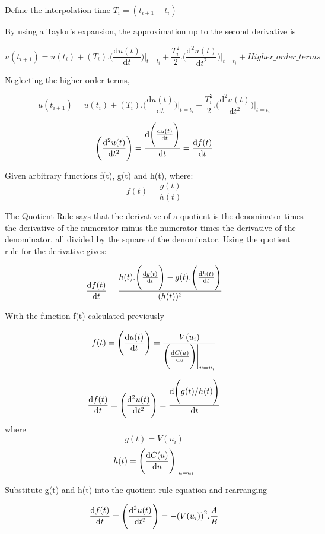 \noindent Define the interpolation time $T_{i} = (t_{i+1} - t_{i})$    
\vspace{0.5cm}   



By using a Taylor's expansion, the approximation up to the second derivative is

\[ u(t_{i+1}) = u(t_{i}) + (T_{i}).{\Bigg ( \frac{\mathrm{d}u(t)}{\mathrm{d}t}  \Bigg ) \Bigg |_{t=t_{i}}} + \frac{T_{i}^{2}}{2}.{\Bigg ( \frac{\mathrm{d^2}u(t)}{\mathrm{d}t^2} \Bigg ) \Bigg |_{t=t_{i}}} + Higher\_order\_terms \]

Neglecting the higher order terms,

\[ u(t_{i+1}) = u(t_{i}) + (T_{i}).{\Bigg ( \frac{\mathrm{d}u(t)}{\mathrm{d}t} \Bigg ) \Bigg |_{t=t_{i}}} + \frac{T_{i}^{2}}{2}.{\Bigg ( \frac{\mathrm{d^2}u(t)}{\mathrm{d}t^2}  \Bigg ) \Bigg |_{t=t_{i}}} \]

\[\Bigg (  \frac{\mathrm{d^2}u(t)}{\mathrm{d}t^2} \Bigg ) =  \odv{\Bigg (\frac{\mathrm{d}u(t)}{\mathrm{d}t}   \Bigg)}{t} = \odv{f(t)}{t}  \]

\vspace{0.5cm}  

Given arbitrary functions f(t), g(t) and h(t), where: 
\[ f(t) = \frac {g(t)}{h(t)} \]

The Quotient Rule says that the derivative of a quotient is the denominator times the derivative of the numerator minus the numerator times the derivative of the denominator, all divided by the square of the denominator. Using the quotient rule for the derivative gives:

\[ \odv{f(t)}{t} = \frac { h(t). \Bigg( \odv{g(t)}{t} \Bigg) - g(t).\Bigg( \odv{h(t)}{t} \Bigg)} {( h(t) )^{2}  } \]

With the function f(t) calculated previously

\[ f(t) = \Bigg ( \odv{u(t)}{t} \Bigg )  =  \frac {V(u_{i})} {\Bigg ( \odv{C(u)}{u} \Bigg ) \Bigg |_{u=u_{i}}} \]

\[ \odv{f(t)}{t}  = \Bigg ( \frac{\mathrm{d^2}u(t)}{\mathrm{d}t^2}  \Bigg ) = \odv{\Bigg( g(t)/h(t) \Bigg) }{t}  \]
where
\[ g(t) = V(u_{i}) \]
\[ h(t) = \Bigg ( \odv{C(u)}{u} \Bigg ) \Bigg |_{u=u_{i}}\]

Substitute g(t) and h(t) into the quotient rule equation and rearranging

\[ \odv{f(t)}{t} = \Bigg ( \frac{\mathrm{d^2}u(t)}{\mathrm{d}t^2} \Bigg )  = - {(V(u_{i}))}^{2}. \frac{A}{B} \]

